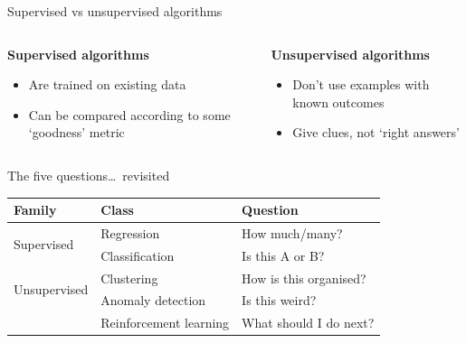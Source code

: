 \begin{frame}{Supervised vs unsupervised algorithms}
    \begin{columns}
        \begin{column}{0.5\textwidth}
            \begin{center}
                \large\bf%
                Supervised algorithms
            \end{center}
            \begin{itemize}
                \item Are trained on existing data
                \item Can be compared according to some `goodness' metric
            \end{itemize}
        \end{column}
        \begin{column}{0.5\textwidth}
            \begin{center}
                \large\bf%
                Unsupervised algorithms
            \end{center}
            \begin{itemize}
                \item Don't use examples with known outcomes
                \item Give clues, not `right answers'
            \end{itemize}
        \end{column}
    \end{columns}
\end{frame}

\begin{frame}{The five questions\ldots~revisited}
    \begin{center}
        \begin{tabular}{lll}
            \toprule
            \textbf{Family}               & \textbf{Class}         & \textbf{Question} \\
            \midrule
            \multirow{2}{*}{Supervised}   & Regression             & How much/many? \\
                                          & Classification         & Is this A or B? \\
            \midrule
            \multirow{2}{*}{Unsupervised} & Clustering             & How is this organised? \\
                                          & Anomaly detection      & Is this weird? \\
            \midrule
                                          & Reinforcement learning & What should I do next? \\
            \bottomrule
        \end{tabular}
    \end{center}
\end{frame}

